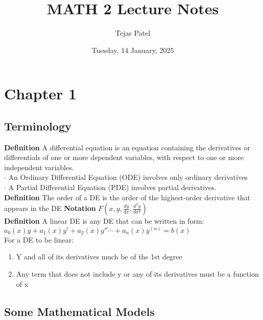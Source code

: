 \documentclass{article}
\title{MATH 2 Lecture Notes}
\date{Tuesday, 14 January, 2025}
\author{Tejas Patel}
\begin{document}
\maketitle
\tableofcontents
\pagebreak
\section{Chapter 1}
\subsection{Terminology}
\textbf{Definition} A differential equation is an equation containing the derivatives or differentials 
of one or more dependent variables, with respect to one or more independent variables.\\
\textbf{$\cdot$} An Ordinary Differential Equation (ODE) involves only ordinary derivatives\\
\textbf{$\cdot$} A Partial Differential Equation (PDE) involves partial derivatives.\\
\textbf{Definition} The order of a DE is the order of the highest-order derivative that appears in the DE
\textbf{Notation} $F(x,y,\frac{dy}{dx}, \frac{d^2y}{dx^2})$\\
\textbf{Definition} A linear DE is any DE that can be written in form:\\
${\displaystyle a_{0}(x)y+a_{1}(x)y'+a_{2}(x)y''\cdots +a_{n}(x)y^{(n)}=b(x)}$\\
For a DE to be linear:
\begin{enumerate}
    \item Y and all of its derivatives much be of the 1st degree
    \item Any term that does not include y or any of its derivatives must be a function of x
\end{enumerate}
\subsection{Some Mathematical Models}
\end{document}
